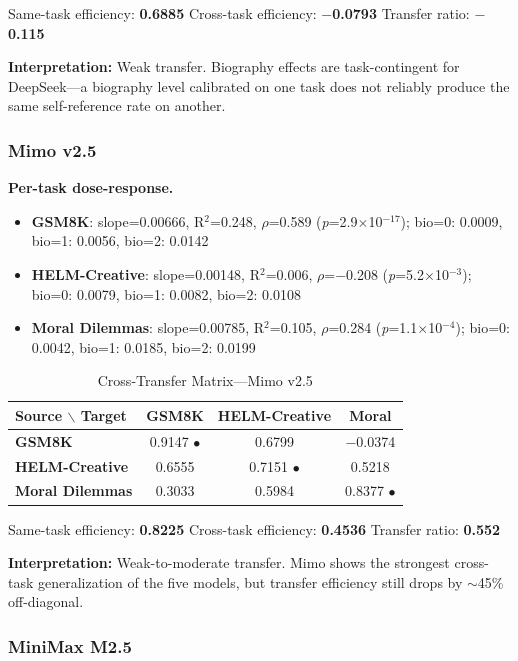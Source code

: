 \documentclass[11pt,a4paper]{article}
\begin{document}
Same-task efficiency: \textbf{0.6885} \quad Cross-task efficiency: \textbf{$-$0.0793} \quad Transfer ratio: \textbf{$-$0.115}

\textbf{Interpretation:} Weak transfer. Biography effects are task-contingent for DeepSeek---a biography level calibrated on one task does not reliably produce the same self-reference rate on another.

\subsubsection{Mimo v2.5}

\textbf{Per-task dose-response.}
\begin{itemize}[nosep]
\item \textbf{GSM8K}: slope=0.00666, R$^2$=0.248, $\rho$=0.589 (\textit{p}=2.9$\times$10$^{-17}$); bio=0: 0.0009, bio=1: 0.0056, bio=2: 0.0142
\item \textbf{HELM-Creative}: slope=0.00148, R$^2$=0.006, $\rho$=$-$0.208 (\textit{p}=5.2$\times$10$^{-3}$); bio=0: 0.0079, bio=1: 0.0082, bio=2: 0.0108
\item \textbf{Moral Dilemmas}: slope=0.00785, R$^2$=0.105, $\rho$=0.284 (\textit{p}=1.1$\times$10$^{-4}$); bio=0: 0.0042, bio=1: 0.0185, bio=2: 0.0199
\end{itemize}

\begin{table}[H]
\centering
\caption{Cross-Transfer Matrix---Mimo v2.5}
\label{tab:ct_mimo}
\begin{tabular}{lccc}
\toprule
\textbf{Source $\backslash$ Target} & \textbf{GSM8K} & \textbf{HELM-Creative} & \textbf{Moral} \\
\midrule
\textbf{GSM8K} & 0.9147 $\bullet$ & 0.6799 & $-$0.0374 \\
\textbf{HELM-Creative} & 0.6555 & 0.7151 $\bullet$ & 0.5218 \\
\textbf{Moral Dilemmas} & 0.3033 & 0.5984 & 0.8377 $\bullet$ \\
\bottomrule
\end{tabular}
\end{table}

Same-task efficiency: \textbf{0.8225} \quad Cross-task efficiency: \textbf{0.4536} \quad Transfer ratio: \textbf{0.552}

\textbf{Interpretation:} Weak-to-moderate transfer. Mimo shows the strongest cross-task generalization of the five models, but transfer efficiency still drops by $\sim$45\% off-diagonal.

\subsubsection{MiniMax M2.5}
\end{document}
